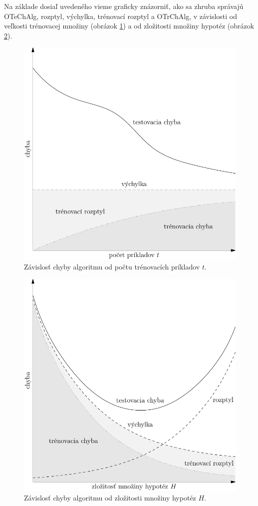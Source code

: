 Na základe dosiaľ uvedeného vieme graficky znázorniť, ako sa zhruba správajú
OTeChAlg, rozptyl, výchylka, trénovací rozptyl a OTrChAlg, v závislosti od
veľkosti trénovacej množiny (obrázok \ref{img:train}) a od zložitosti
množiny hypotéz (obrázok \ref{img:hypo}).

\begin{figure}
  \centering
  \includegraphics[scale=0.8]{obrazky/krivky1.pdf}
  \caption{Závislosť chyby algoritmu od počtu trénovacích príkladov $t$.}
  \label{img:train}
\end{figure}

\begin{figure}
  \centering
  \includegraphics[scale=0.8]{obrazky/krivky2.pdf}
  \caption{Závislosť chyby algoritmu od zložitosti množiny hypotéz $H$.}
  \label{img:hypo}
\end{figure}




